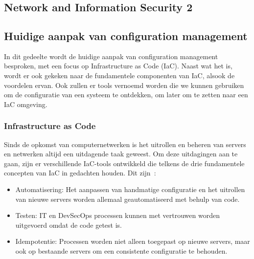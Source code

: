 \chapter{}%
\label{ch:stand-van-zaken}



\section{Network and Information Security 2}%
\label{sec:nis2}

\section{Huidige aanpak van configuration management}%
\label{sec:huidige-aanpak-van-configuration-management}

In dit gedeelte wordt de huidige aanpak van configuration management besproken, met een focus op Infrastructure as Code (IaC).
Naast wat het is, wordt er ook gekeken naar de fundamentele componenten van IaC, alsook de voordelen ervan.
Ook zullen er tools vernoemd worden die we kunnen gebruiken om de configuratie van een systeem te ontdekken, om later om te zetten naar een IaC omgeving.

\subsection{Infrastructure as Code}%
\label{sub:iac}

Sinds de opkomst van computernetwerken is het uitrollen en beheren van servers en netwerken altijd een uitdagende taak geweest.
Om deze uitdagingen aan te gaan, zijn er verschillende IaC-tools ontwikkeld die telkens de drie fundamentele concepten van IaC in gedachten houden.
Dit zijn~\autocite{chef-what-is-iac}:
\begin{itemize}
    \item Automatisering: Het aanpassen van handmatige configuratie en het uitrollen van nieuwe servers worden allemaal geautomatiseerd met behulp van code.
    \item Testen: IT en DevSecOps processen kunnen met vertrouwen worden uitgevoerd omdat de code getest is.
    \item Idempotentie: Processen worden niet alleen toegepast op nieuwe servers, maar ook op bestaande servers om een consistente configuratie te behouden.
\end{itemize}

